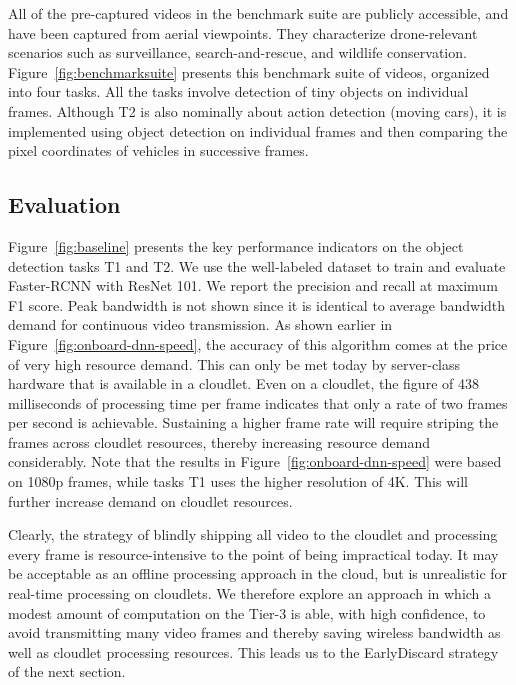 All of the pre-captured videos in the benchmark suite are publicly accessible,
and have been captured from aerial viewpoints. They characterize drone-relevant
scenarios such as surveillance, search-and-rescue, and wildlife conservation.
Figure~\ref{fig:benchmarksuite} presents this benchmark suite of videos,
organized into four tasks. All the tasks involve detection of tiny objects on
individual frames. Although T2 is also nominally about action detection (moving
cars), it is implemented using object detection on individual frames and then
comparing the pixel coordinates of vehicles in successive frames.

\subsection{Evaluation}
\label{sec:dumbdrone-results}

Figure~\ref{fig:baseline} presents the key performance indicators on the object
detection tasks T1 and T2. We use the well-labeled dataset to train and evaluate
Faster-RCNN with ResNet 101. We report the precision and recall at maximum F1
score.  Peak bandwidth is not shown since it is identical to average bandwidth
demand for continuous video transmission.  As shown earlier in
Figure~\ref{fig:onboard-dnn-speed}, the accuracy of this algorithm comes at the
price of very high resource demand.  This can only be met today by server-class
hardware that is available in a cloudlet.  Even on a cloudlet, the figure of 438
milliseconds of processing time per frame indicates that only a rate of two
frames per second is achievable.  Sustaining a higher frame rate will require
striping the frames across cloudlet resources, thereby increasing resource
demand considerably.  Note that the results in
Figure~\ref{fig:onboard-dnn-speed} were based on 1080p frames, while tasks T1
uses the higher resolution of 4K. This will further increase demand on cloudlet
resources.

Clearly, the strategy of blindly shipping all video to the cloudlet and
processing every frame is resource-intensive to the point of being impractical
today.  It may be acceptable as an offline processing approach in the cloud, but
is unrealistic for real-time processing on cloudlets.  We therefore explore an
approach in which a modest amount of computation on the Tier-3 is able, with
high confidence, to avoid transmitting many video frames and thereby saving
wireless bandwidth as well as cloudlet processing resources.  This leads us to
the EarlyDiscard strategy of the next section.



